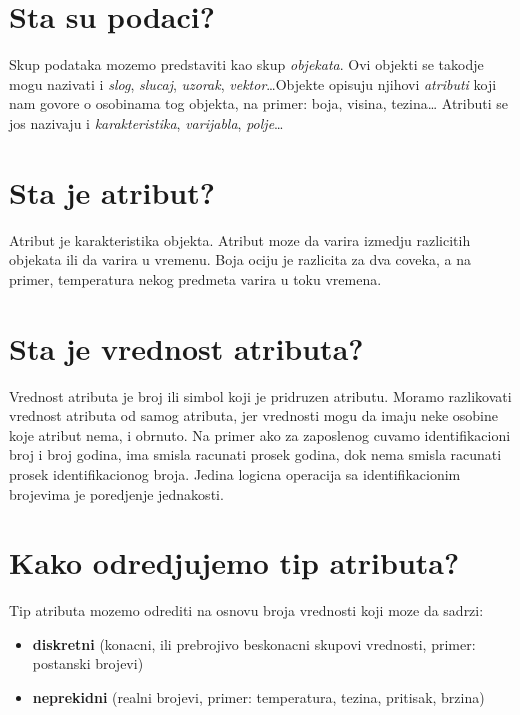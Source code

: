 \documentclass[a4paper]{article}
\begin{document}
\section{Sta su podaci?}

Skup podataka mozemo predstaviti kao skup \emph{objekata}. Ovi objekti se takodje mogu nazivati i
\emph{slog}, \emph{slucaj}, \emph{uzorak}, \emph{vektor}\ldots Objekte opisuju njihovi
\emph{atributi} koji nam govore o osobinama tog objekta, na primer: boja, visina, tezina\ldots
Atributi se jos nazivaju i \emph{karakteristika}, \emph{varijabla}, \emph{polje}\ldots

\section{Sta je atribut?}

Atribut je karakteristika objekta. Atribut moze da varira izmedju razlicitih objekata ili da varira
u vremenu. Boja ociju je razlicita za dva coveka, a na primer, temperatura nekog predmeta varira u
toku vremena.

\section{Sta je vrednost atributa?}

Vrednost atributa je broj ili simbol koji je pridruzen atributu. Moramo razlikovati vrednost
atributa od samog atributa, jer vrednosti mogu da imaju neke osobine koje atribut nema, i obrnuto.
Na primer ako za zaposlenog cuvamo identifikacioni broj i broj godina, ima smisla racunati prosek
godina, dok nema smisla racunati prosek identifikacionog broja. Jedina logicna operacija sa
identifikacionim brojevima je poredjenje jednakosti.

\section{Kako odredjujemo tip atributa?}

Tip atributa mozemo odrediti na osnovu broja vrednosti koji moze da sadrzi:

\begin{itemize}
    \item \textbf{diskretni} (konacni, ili prebrojivo beskonacni skupovi vrednosti, primer:
        postanski brojevi)
    \item \textbf{neprekidni} (realni brojevi, primer: temperatura, tezina, pritisak, brzina)
\end{itemize}
\end{document}
